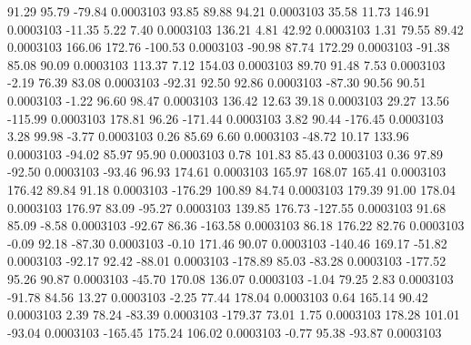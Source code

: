        91.29       95.79      -79.84     0.0003103
       93.85       89.88       94.21     0.0003103
       35.58       11.73      146.91     0.0003103
      -11.35        5.22        7.40     0.0003103
      136.21        4.81       42.92     0.0003103
        1.31       79.55       89.42     0.0003103
      166.06      172.76     -100.53     0.0003103
      -90.98       87.74      172.29     0.0003103
      -91.38       85.08       90.09     0.0003103
      113.37        7.12      154.03     0.0003103
       89.70       91.48        7.53     0.0003103
       -2.19       76.39       83.08     0.0003103
      -92.31       92.50       92.86     0.0003103
      -87.30       90.56       90.51     0.0003103
       -1.22       96.60       98.47     0.0003103
      136.42       12.63       39.18     0.0003103
       29.27       13.56     -115.99     0.0003103
      178.81       96.26     -171.44     0.0003103
        3.82       90.44     -176.45     0.0003103
        3.28       99.98       -3.77     0.0003103
        0.26       85.69        6.60     0.0003103
      -48.72       10.17      133.96     0.0003103
      -94.02       85.97       95.90     0.0003103
        0.78      101.83       85.43     0.0003103
        0.36       97.89      -92.50     0.0003103
      -93.46       96.93      174.61     0.0003103
      165.97      168.07      165.41     0.0003103
      176.42       89.84       91.18     0.0003103
     -176.29      100.89       84.74     0.0003103
      179.39       91.00      178.04     0.0003103
      176.97       83.09      -95.27     0.0003103
      139.85      176.73     -127.55     0.0003103
       91.68       85.09       -8.58     0.0003103
      -92.67       86.36     -163.58     0.0003103
       86.18      176.22       82.76     0.0003103
       -0.09       92.18      -87.30     0.0003103
       -0.10      171.46       90.07     0.0003103
     -140.46      169.17      -51.82     0.0003103
      -92.17       92.42      -88.01     0.0003103
     -178.89       85.03      -83.28     0.0003103
     -177.52       95.26       90.87     0.0003103
      -45.70      170.08      136.07     0.0003103
       -1.04       79.25        2.83     0.0003103
      -91.78       84.56       13.27     0.0003103
       -2.25       77.44      178.04     0.0003103
        0.64      165.14       90.42     0.0003103
        2.39       78.24      -83.39     0.0003103
     -179.37       73.01        1.75     0.0003103
      178.28      101.01      -93.04     0.0003103
     -165.45      175.24      106.02     0.0003103
       -0.77       95.38      -93.87     0.0003103
